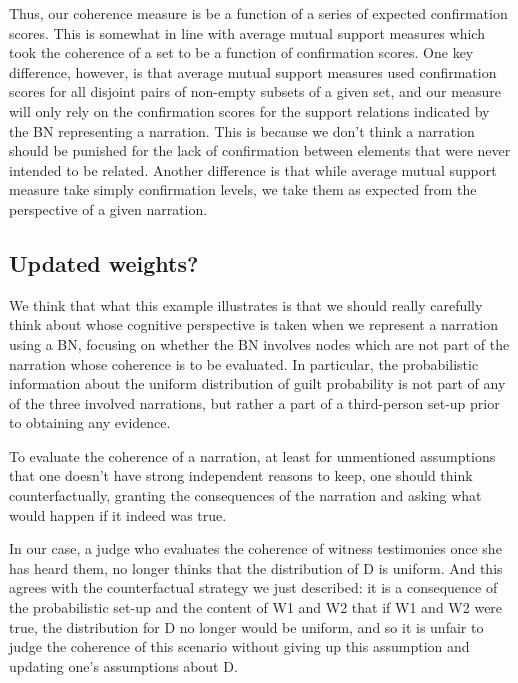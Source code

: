 \documentclass[10pt,]{scrartcl}
\begin{document}
Thus, our coherence measure is be a function of a series of expected  confirmation scores. This is somewhat in line with average mutual
support measures which took the coherence of a set to be a function of
confirmation scores. One key difference, however, is that average mutual
support measures used confirmation scores for all disjoint pairs of
non-empty subsets of a given set, and our measure will only rely on the
confirmation scores for the support relations indicated by the BN
representing a narration. This is because we don't think a narration
should be punished for the lack of confirmation between elements that
were never intended to be related. Another difference is that while average mutual support measure take simply confirmation levels, we take them as expected from the perspective of a given narration.







\subsection{Updated weights?}



We think that what this example illustrates is that we should really
carefully think about whose cognitive perspective is taken when we
represent a narration using a BN, focusing on whether the BN involves
nodes which are not part of the narration whose coherence is to be
evaluated. In particular, the probabilistic information about the
uniform distribution of guilt probability is not part of any of the
three involved narrations, but rather a part of a third-person set-up
prior to obtaining any evidence.

To evaluate the coherence of a narration, at least for unmentioned
assumptions that one doesn't have strong independent reasons to keep,
one should think counterfactually, granting the consequences of the
narration and asking what would happen if it indeed was true. 



In our
case, a judge who evaluates the coherence of witness testimonies once
she has heard them, no longer thinks that the distribution of \textsf{D}
is uniform. And this agrees with the counterfactual strategy we just
described: it is a consequence of the probabilistic set-up and the
content of \textsf{W1} and \textsf{W2} that if \textsf{W1} and
\textsf{W2} were true, the distribution for \textsf{D} no longer would
be uniform, and so it is unfair to judge the coherence of this scenario
without giving up this assumption and updating one's assumptions about
\textsf{D}.
\end{document}
